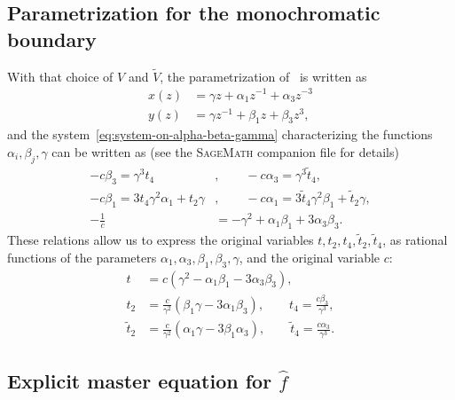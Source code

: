 \documentclass{scrartcl}
\newcommand\wt[1]{\widetilde{#1}}
\newcommand\wh[1]{\widehat{#1}}
\begin{document}
\subsection{Parametrization for the monochromatic boundary}

With that choice of $V$ and $\wt{V}$, the parametrization of~\cite[Theorem 8.3.1]{eynard} is written as
\begin{equation}
\begin{aligned}
x(z) &= \gamma z + \alpha_1 z^{-1} +\alpha_3 z^{-3} \\
y(z) &= \gamma z^{-1} + \beta_1 z + \beta_3 z^3,
\label{eq:parametrization-of-x(z)-and-y(z)-for-E=0}
\end{aligned}
\end{equation}
and the system~\eqref{eq:system-on-alpha-beta-gamma} characterizing the functions $\alpha_i,\beta_j,\gamma$ can be written as (see the \textsc{SageMath} companion file for details)
\begin{equation}
\begin{aligned}
-c\beta_3 = \gamma^3t_4&, \qquad -c\alpha_3 = \gamma^3\widetilde{t}_4,\\
 -c\beta_1 = 3t_4\gamma^2\alpha_1+t_2\gamma&, \qquad -c\alpha_1 = 3\widetilde{t}_4\gamma^2\beta_1 +\widetilde{t}_2\gamma,\\
-\frac{1}{c} &= -\gamma^2 + \alpha_1\beta_1 + 3\alpha_3\beta_3.
\label{eq:system-for-alpha-i-beta-i-for-t2-and-t4}
\end{aligned}
\end{equation}
These relations allow us to express the original variables $t,t_2,t_4,\wt{t}_2,\wt{t}_4$, as rational functions of the parameters $\alpha_1,\alpha_3,\beta_1,\beta_3,\gamma$, and the original variable $c$:
\begin{equation}
\begin{aligned}
t &= c(\gamma^2-\alpha_1\beta_1-3\alpha_3\beta_3),\\
t_2&=\frac{c}{\gamma^2}(\beta_1\gamma-3\alpha_1\beta_3), \qquad t_4=\frac{c\beta_3}{\gamma^3},\\
\wt{t}_2&=\frac{c}{\gamma^2}(\alpha_1\gamma-3\beta_1\alpha_3), \qquad \wt{t}_4=\frac{c\alpha_3}{\gamma^3}.
\end{aligned}
\label{eq:param-t-ti-ising-quads}
\end{equation}


\subsection{Explicit master equation for $\wh{f}$}
\label{sec:master-eq-ising-quads}
\end{document}
